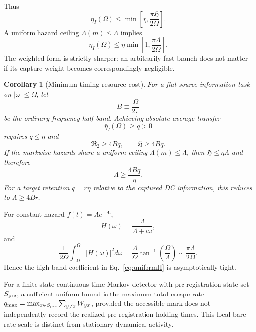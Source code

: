 \documentclass[aps,prapplied,preprint,nofootinbib]{revtex4-2}
\newtheorem{corollary}{Corollary}
\newcommand{\Rtwo}{\mathfrak R_2}
\newcommand{\Hcap}{\mathfrak H}
\begin{document}
Thus
\begin{equation}
\boxed{
\bar\eta_I(\Omega)
\le\min\left[\eta,\frac{\pi\Hcap}{2\Omega}\right].}
\label{eq:Hbound}
\end{equation}
A uniform hazard ceiling $\Lambda(m)\le\Lambda$ implies
\begin{equation}
\bar\eta_I(\Omega)\le
\eta\min\left[1,\frac{\pi\Lambda}{2\Omega}\right].
\label{eq:uniformH}
\end{equation}
The weighted form is strictly sharper: an arbitrarily fast branch does not matter if its capture weight becomes correspondingly negligible.

\begin{corollary}[Minimum timing-resource cost]
For a flat source-information task on $|\omega|\le\Omega$, let
\begin{equation}
B\equiv\frac{\Omega}{2\pi}
\end{equation}
be the ordinary-frequency half-band. Achieving absolute average transfer
\begin{equation}
\bar\eta_I(\Omega)\ge q>0
\end{equation}
requires $q\le\eta$ and
\begin{equation}
\boxed{\Rtwo\ge4Bq,\qquad \Hcap\ge4Bq.}
\label{eq:resourceCost}
\end{equation}
If the markwise hazards share a uniform ceiling $\Lambda(m)\le\Lambda$, then $\Hcap\le\eta\Lambda$ and therefore
\begin{equation}
\boxed{\Lambda\ge\frac{4Bq}{\eta}.}
\label{eq:uniformResourceCost}
\end{equation}
For a target retention $q=r\eta$ relative to the captured DC information, this reduces to $\Lambda\ge4Br$.
\end{corollary}

For constant hazard $f(t)=\Lambda e^{-\Lambda t}$,
\begin{equation}
H(\omega)=\frac{\Lambda}{\Lambda+i\omega},
\end{equation}
and
\begin{equation}
\frac{1}{2\Omega}\int_{-\Omega}^{\Omega}|H(\omega)|^2d\omega
=\frac{\Lambda}{\Omega}\tan^{-1}\!\left(\frac{\Omega}{\Lambda}\right)
\sim\frac{\pi\Lambda}{2\Omega}.
\end{equation}
Hence the high-band coefficient in Eq.~\eqref{eq:uniformH} is asymptotically tight.

For a finite-state continuous-time Markov detector with pre-registration state set $S_{\rm pre}$, a sufficient uniform bound is the maximum total escape rate $q_{\max}=\max_{x\in S_{\rm pre}}\sum_{y\ne x}W_{yx}$, provided the accessible mark does not independently record the realized pre-registration holding times. This local bare-rate scale is distinct from stationary dynamical activity.
\end{document}
